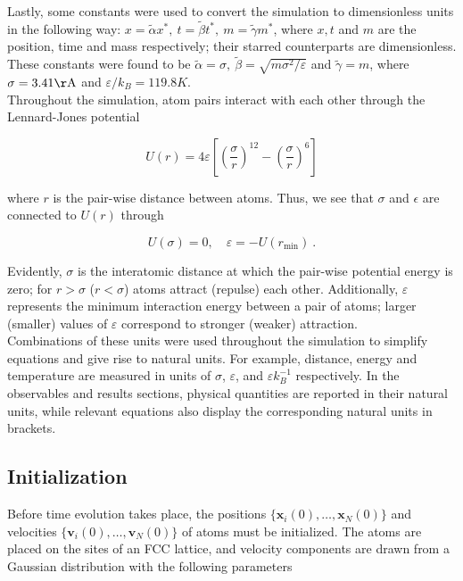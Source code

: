 \documentclass[twocolumn,10pt]{article}
\begin{document}
Lastly, some constants were used to convert the simulation to dimensionless units in the following way: $x = \tilde\alpha x^*, \ t = \tilde\beta t^*, \ m = \tilde\gamma m^*$, where $x,t$ and $m$ are the position, time and mass respectively; their starred counterparts are dimensionless. These constants were found to be $\tilde\alpha = \sigma, \ \tilde\beta = \sqrt{m\sigma^2/\varepsilon}$ and $\tilde\gamma = m$, where $\sigma = 3.41\mathrm{\AA}$ and $\varepsilon/k_B = 119.8K$.\\

Throughout the simulation, atom pairs interact with each other through the Lennard-Jones potential

\begin{equation}
    U(r) = 4\varepsilon\left[\left(\frac{\sigma}{r}\right)^{12} - \left(\frac{\sigma}{r}\right)^{6}\right]
    \label{LJ}
\end{equation}

\noindent where $r$ is the pair-wise distance between atoms. Thus, we see that $\sigma$ and $\epsilon$ are connected to $U(r)$ through

\begin{equation}
    U(\sigma) = 0, \quad \varepsilon= -U(r_{\text{min}}) \ .
\end{equation}

\noindent Evidently, $\sigma$ is the interatomic distance at which the pair-wise potential energy is zero; for $r>\sigma$ ($r<\sigma$) atoms attract (repulse) each other. Additionally, $\varepsilon$ represents the minimum interaction energy between a pair of atoms; larger (smaller) values of $\varepsilon$ correspond to stronger (weaker) attraction.\\

Combinations of these units were used throughout the simulation to simplify equations and give rise to natural units. For example, distance, energy and temperature are measured in units of $\sigma$, $\varepsilon$, and $\varepsilon k_B^{-1}$ respectively. In the observables and results sections, physical quantities are reported in their natural units, while relevant equations also display the corresponding natural units in brackets. 

\subsection{Initialization}

Before time evolution takes place, the positions $\{\mathbf{x}_i(0),\dots,\mathbf{x}_N(0) \}$ and velocities $\{\mathbf{v}_i(0),\dots,\mathbf{v}_N(0) \}$ of atoms must be initialized. The atoms are placed on the sites of an FCC lattice, and velocity components are drawn from a Gaussian distribution with the following parameters
\end{document}
